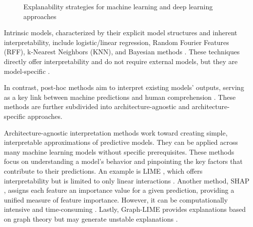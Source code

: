 \begin{figure}[h!]
    \centering
        \caption{Explanability strategies for machine learning and deep learning approaches\label{fig:sota3_methods}}
\end{figure}

Intrinsic models, characterized by their explicit model structures and inherent interpretability, include logistic/linear regression, Random Fourier Features (RFF), k-Nearest Neighbors (KNN), and Bayesian methods \cite{chaddad2023survey}. These techniques directly offer interpretability and do not require external models, but they are model-specific \cite{wu2018faithful}. 

In contrast, post-hoc methods aim to interpret existing models' outputs, serving as a key link between machine predictions and human comprehension \cite{speith2022review}. These methods are further subdivided into architecture-agnostic and architecture-specific approaches. 

Architecture-agnostic interpretation methods work toward creating simple, interpretable approximations of predictive models. They can be applied across many machine learning models without specific prerequisites. These methods focus on understanding a model's behavior and pinpointing the key factors that contribute to their predictions. An example is LIME \cite{haghanifar2022covid}, which offers interpretability but is limited to only linear interactions \cite{bramhall2020qlime}. Another method, SHAP \cite{rashed2021deep}, assigns each feature an importance value for a given prediction, providing a unified measure of feature importance. However, it can be computationally intensive and time-consuming \cite{le2021machine}. Lastly, Graph-LIME \cite{huang2022graphlime} provides explanations based on graph theory but may generate unstable explanations \cite{nguyen2021evaluation}.

